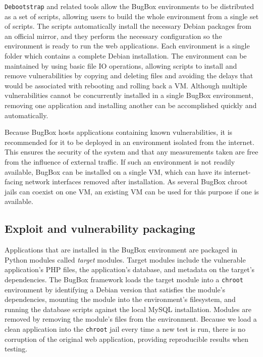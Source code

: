 \documentclass[letterpaper,twocolumn,10pt]{article}
\begin{document}
\texttt{Debootstrap} and related tools allow the BugBox environments to be distributed as a set of scripts, allowing users to build the whole environment from a single set of scripts. The scripts automatically install the necessary Debian packages from an official mirror, and they perform the necessary configuration so the environment is ready to run the web applications. Each environment is a single folder which contains a complete Debian installation. The environment can be maintained by using basic file IO operations, allowing scripts to install and remove vulnerabilities by copying and deleting files and avoiding the delays that would be associated with rebooting and rolling back a VM. Although multiple vulnerabilities cannot be concurrently installed in a single BugBox environment, removing one application and installing another can be accomplished quickly and automatically.

Because BugBox hosts applications containing known vulnerabilities, it is recommended for it to be deployed in an environment isolated from the internet. This ensures the security of the system and that any measurements taken are free from the influence of external traffic. If such an environment is not readily available, BugBox can be installed on a single VM, which can have its internet-facing network interfaces removed after installation. As several BugBox chroot jails can coexist on one VM, an existing VM can be used for this purpose if one is available.

\subsection{Exploit and vulnerability packaging}

Applications that are installed in the BugBox environment are packaged in Python modules called \textit{target} modules. Target modules include the vulnerable application's PHP files, the application's database, and metadata on the target's dependencies. The BugBox framework loads the target module into a \texttt{chroot} environment by identifying a Debian version that satisfies the module's dependencies, mounting the module into the environment's filesystem, and running the database scripts against the local MySQL installation. Modules are removed by removing the module's files from the environment. Because we load a clean application into the {\tt chroot} jail every time a new test is run, there is no corruption of the original web application, providing reproducible results when testing.
\end{document}
